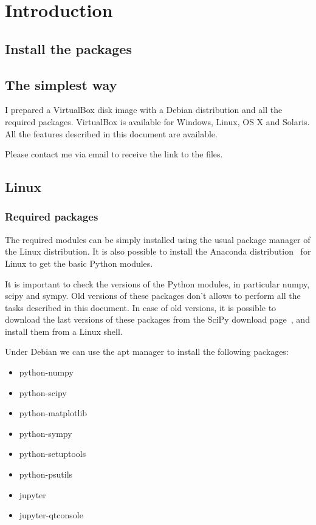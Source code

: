 \chapter{Introduction}

\section{Install the packages}

\section{The simplest way}
I prepared a VirtualBox disk image \cite{VIRTUALBOX} with a Debian distribution 
and all the required packages. VirtualBox is available for Windows, Linux, 
OS X and Solaris. All the features described in this document are available.

Please contact me via email to receive the link to the files.

\section{Linux}

\subsection{Required packages}

The required modules can be simply installed using the usual package manager 
of the Linux distribution.
It is also possible to install the Anaconda distribution~\cite{ANACONDA} for 
Linux to get the basic Python modules.

It is important to check the versions of the Python modules, in particular 
numpy, scipy and sympy. Old versions of these packages don't allows to perform 
all the tasks described in this document.
In case of old versions, it is possible to download the last versions of these 
packages 
from the SciPy download page~\cite{SCIPYDOWNLOAD}, and install them from a 
Linux 
shell.

Under Debian we can use the apt manager to install the 
following packages:
\begin{itemize}
\item python-numpy
\item python-scipy
\item python-matplotlib 
\item python-sympy
\item python-setuptools
\item python-psutils
\item jupyter
\item jupyter-qtconsole
\end{itemize}


